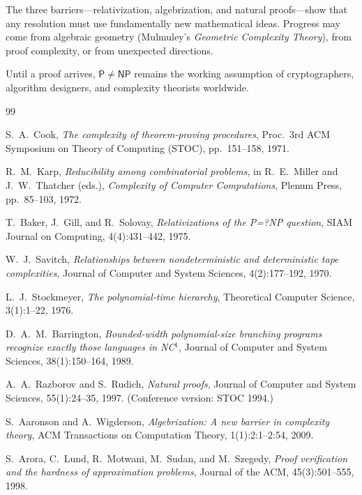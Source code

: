 \documentclass[12pt,a4paper]{amsart}
\theoremstyle{definition}
\newcommand{\Pclass}{\mathsf{P}}
\newcommand{\NP}{\mathsf{NP}}
\begin{document}
The three barriers---relativization, algebrization, and natural proofs---show
that any resolution must use fundamentally new mathematical ideas.  Progress
may come from algebraic geometry (Mulmuley's \emph{Geometric Complexity Theory}),
from proof complexity, or from unexpected directions.

Until a proof arrives, $\Pclass\neq\NP$ remains the working assumption of
cryptographers, algorithm designers, and complexity theorists worldwide.

\begin{thebibliography}{99}

S.~A.\ Cook,
\textit{The complexity of theorem-proving procedures},
Proc.\ 3rd ACM Symposium on Theory of Computing (STOC), pp.~151--158, 1971.

R.~M.\ Karp,
\textit{Reducibility among combinatorial problems},
in R.~E.\ Miller and J.~W.\ Thatcher (eds.), \textit{Complexity of Computer
Computations}, Plenum Press, pp.~85--103, 1972.

T.~Baker, J.~Gill, and R.~Solovay,
\textit{Relativizations of the P=?NP question},
SIAM Journal on Computing, 4(4):431--442, 1975.

W.~J.\ Savitch,
\textit{Relationships between nondeterministic and deterministic tape complexities},
Journal of Computer and System Sciences, 4(2):177--192, 1970.

L.~J.\ Stockmeyer,
\textit{The polynomial-time hierarchy},
Theoretical Computer Science, 3(1):1--22, 1976.

D.~A.\ M.\ Barrington,
\textit{Bounded-width polynomial-size branching programs recognize exactly those
languages in NC$^1$},
Journal of Computer and System Sciences, 38(1):150--164, 1989.

A.~A.\ Razborov and S.~Rudich,
\textit{Natural proofs},
Journal of Computer and System Sciences, 55(1):24--35, 1997.
(Conference version: STOC 1994.)

S.~Aaronson and A.~Wigderson,
\textit{Algebrization: A new barrier in complexity theory},
ACM Transactions on Computation Theory, 1(1):2:1--2:54, 2009.

S.~Arora, C.~Lund, R.~Motwani, M.~Sudan, and M.~Szegedy,
\textit{Proof verification and the hardness of approximation problems},
Journal of the ACM, 45(3):501--555, 1998.


\end{thebibliography}
\end{document}
